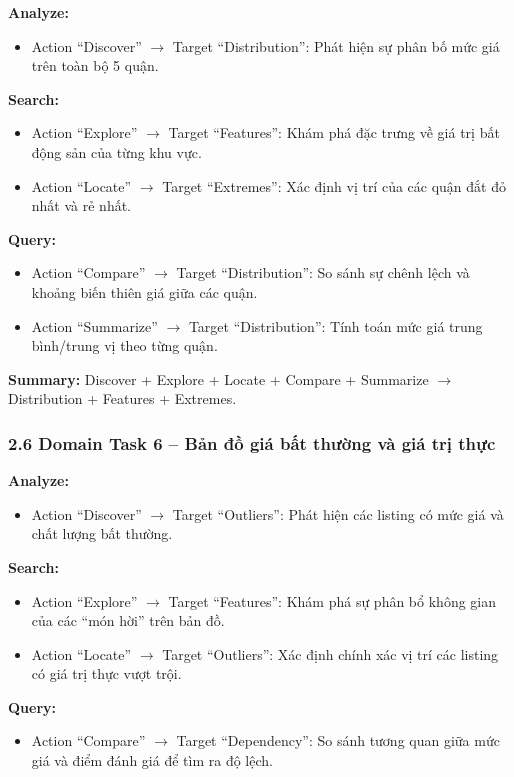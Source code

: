 \textbf{Analyze:} 
\begin{itemize}
    \item Action ``Discover'' $\rightarrow$ Target ``Distribution'': Phát hiện sự phân bố mức giá trên toàn bộ 5 quận.
\end{itemize}

\textbf{Search:} 
\begin{itemize}
    \item Action ``Explore'' $\rightarrow$ Target ``Features'': Khám phá đặc trưng về giá trị bất động sản của từng khu vực. 
    \item Action ``Locate'' $\rightarrow$ Target ``Extremes'': Xác định vị trí của các quận đắt đỏ nhất và rẻ nhất.
\end{itemize}

\textbf{Query:} 
\begin{itemize}
    \item Action ``Compare'' $\rightarrow$ Target ``Distribution'': So sánh sự chênh lệch và khoảng biến thiên giá giữa các quận. 
    \item Action ``Summarize'' $\rightarrow$ Target ``Distribution'': Tính toán mức giá trung bình/trung vị theo từng quận.
\end{itemize}

\textbf{Summary:} Discover + Explore + Locate + Compare + Summarize $\rightarrow$ Distribution + Features + Extremes.

\subsubsection*{2.6 Domain Task 6 -- Bản đồ giá bất thường và giá trị thực}

\textbf{Analyze:} 
\begin{itemize}
    \item Action ``Discover'' $\rightarrow$ Target ``Outliers'': Phát hiện các listing có mức giá và chất lượng bất thường.
\end{itemize}

\textbf{Search:} 
\begin{itemize}
    \item Action ``Explore'' $\rightarrow$ Target ``Features'': Khám phá sự phân bổ không gian của các ``món hời'' trên bản đồ. 
    \item Action ``Locate'' $\rightarrow$ Target ``Outliers'': Xác định chính xác vị trí các listing có giá trị thực vượt trội.
\end{itemize}

\textbf{Query:} 
\begin{itemize}
    \item Action ``Compare'' $\rightarrow$ Target ``Dependency'': So sánh tương quan giữa mức giá và điểm đánh giá để tìm ra độ lệch.
\end{itemize}

